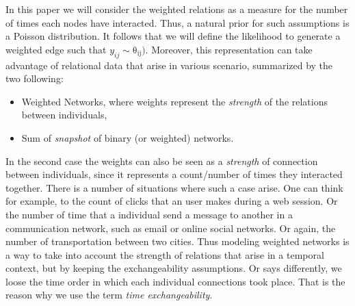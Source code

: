 In this paper we will consider the weighted relations as a measure for the number of times each nodes have interacted. Thus, a natural prior for such assumptions is a Poisson distribution. It follows that we    will define the likelihood to generate a weighted edge such that $y_{ij} \sim \mathrm{\theta_{ij})}$. Moreover, this representation can take advantage of relational data that arise in various scenario,          summarized by the two following:                                                                                                                                                                                   
\begin{itemize}                                                                                                                                                                                                    
\item Weighted Networks, where weights represent the \emph{strength} of the relations between individuals,                                                                                                         
\item Sum of \emph{snapshot} of binary (or weighted) networks.                                                                                                                                                     
\end{itemize}                                                                                                                                                                                                      
                                                                                                                                                                                                                   
In the second case the weights can also be seen as a \emph{strength} of connection between individuals, since it represents a count/number of times they interacted together. There is a number of situations      where such a case arise. One can think for example, to the count of clicks that an user makes during a web session. Or the number of time that a individual send a message to another in a communication network,  such as email or online social networks. Or again, the number of transportation between two cities. Thus modeling weighted networks is a way to take into account the strength of relations that arise in a        temporal context, but by keeping the exchangeability assumptions. Or says differently, we loose the time order in which each individual connections took place. That is the reason why we use the term \emph{time  exchangeability}.                                                                                                                                                                                                  
                                                                                                                                                                                                                   
